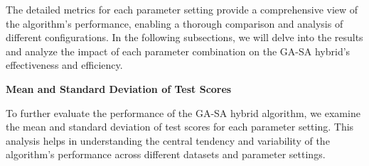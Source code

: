 \documentclass{article}
\begin{document}
    The detailed metrics for each parameter setting provide a comprehensive view of the algorithm's performance, enabling a thorough comparison and analysis of different configurations. In the following subsections, we will delve into the results and analyze the impact of each parameter combination on the GA-SA hybrid's effectiveness and efficiency.

    \textbf{Mean and Standard Deviation of Test Scores}

    To further evaluate the performance of the GA-SA hybrid algorithm, we examine the mean and standard deviation of test scores for each parameter setting. This analysis helps in understanding the central tendency and variability of the algorithm's performance across different datasets and parameter settings.

    \begin{table}[H]
        \centering
\end{table}
\end{document}
